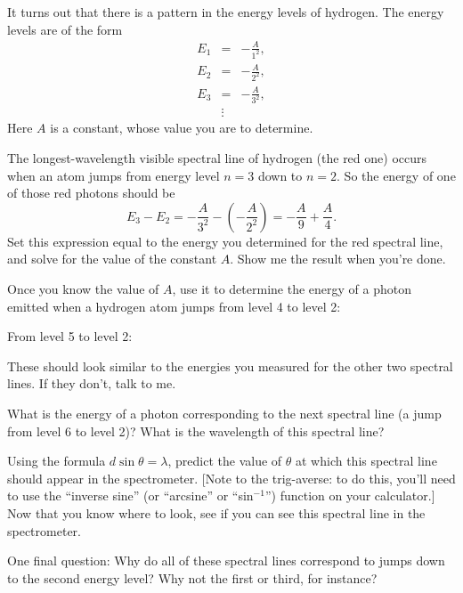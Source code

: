 It turns out that there is a pattern in the energy levels of hydrogen.
The energy levels are of the form
\begin{eqnarray*}
E_1&=&-\frac{A}{1^2},\\
E_2&=&-\frac{A}{2^2},\\
E_3&=&-\frac{A}{3^2},\\
&\vdots&
\end{eqnarray*}
Here $A$ is a constant, whose value you are to determine.

The longest-wavelength visible spectral line of hydrogen
(the red one) occurs when an atom jumps from energy level $n=3$
down to $n=2$.  So the energy of one of those red photons should be
$$
E_3-E_2=-\frac{A}{3^2}-\left(-\frac{A}{2^2}\right)=-\frac{A}{9}+\frac{A}{4}.
$$
Set this expression equal to the energy you determined for the red spectral
line, and solve for the value of the constant $A$.  Show me the
result when you're done.

\answerspace{2.5in}

\pagebreak[3]

Once you know the value of $A$, use it to determine the energy of a photon
emitted when a hydrogen atom jumps from level 4 to level 2:

\answerspace{1in}

From level 5 to level 2:

\answerspace{1in}

These should look similar to the energies you measured for the other
two spectral lines.  If they don't, talk to me.

What is the energy of a photon corresponding to the next spectral line
(a jump from level 6 to level 2)?  What is the wavelength of 
this spectral line?

\answerspace{1.5in}

Using the formula $d\sin\theta=\lambda$, predict the value of $\theta$
at which this spectral line should appear in the spectrometer.
[Note to the trig-averse: to do this, you'll need to use the ``inverse
sine'' (or ``arcsine'' or ``sin$^{-1}$'') function on your calculator.]
Now that you know where to look, see if you can see this spectral line
in the spectrometer.

\answerspace{1in}

One final question: Why do all of these spectral lines correspond
to jumps down to the second energy level?  Why not the first or third,
for instance?


